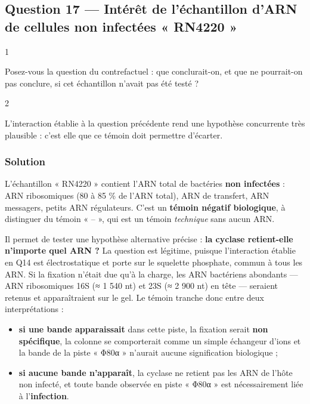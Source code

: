 \documentclass[11pt,a4paper]{article}
\providecommand{\tightlist}{\setlength{\itemsep}{0pt}\setlength{\parskip}{0pt}}
\begin{document}
\hypertarget{question-17-intuxe9ruxeat-de-luxe9chantillon-darn-de-cellules-non-infectuxe9es-rn4220}{%
\subsection{Question 17 --- Intérêt de l'échantillon d'ARN de cellules non infectées « RN4220 »}\label{question-17-intuxe9ruxeat-de-luxe9chantillon-darn-de-cellules-non-infectuxe9es-rn4220}}

\begin{indication}{1}

Posez-vous la question du contrefactuel : que conclurait-on, et que ne pourrait-on pas conclure, si cet échantillon n'avait pas été testé ?

\end{indication}

\begin{indication}{2}

L'interaction établie à la question précédente rend une hypothèse concurrente très plausible : c'est elle que ce témoin doit permettre d'écarter.

\end{indication}

\hypertarget{solution-16}{%
\subsubsection{Solution}\label{solution-16}}

L'échantillon « RN4220 » contient l'ARN total de bactéries \textbf{non infectées} : ARN ribosomiques (80 à 85 \% de l'ARN total), ARN de transfert, ARN messagers, petits ARN régulateurs. C'est un \textbf{témoin négatif biologique}, à distinguer du témoin « -- », qui est un témoin \emph{technique} sans aucun ARN.

Il permet de tester une hypothèse alternative précise : \textbf{la cyclase retient-elle n'importe quel ARN ?} La question est légitime, puisque l'interaction établie en Q14 est électrostatique et porte sur le squelette phosphate, commun à tous les ARN. Si la fixation n'était due qu'à la charge, les ARN bactériens abondants --- ARN ribosomiques 16S (≈ 1 540 nt) et 23S (≈ 2 900 nt) en tête --- seraient retenus et apparaîtraient sur le gel. Le témoin tranche donc entre deux interprétations :

\begin{itemize}
\tightlist
\item
  \textbf{si une bande apparaissait} dans cette piste, la fixation serait \textbf{non spécifique}, la colonne se comporterait comme un simple échangeur d'ions et la bande de la piste « Φ80α » n'aurait aucune signification biologique ;
\item
  \textbf{si aucune bande n'apparaît}, la cyclase ne retient pas les ARN de l'hôte non infecté, et toute bande observée en piste « Φ80α » est nécessairement liée à l'\textbf{infection}.
\end{itemize}
\end{document}
